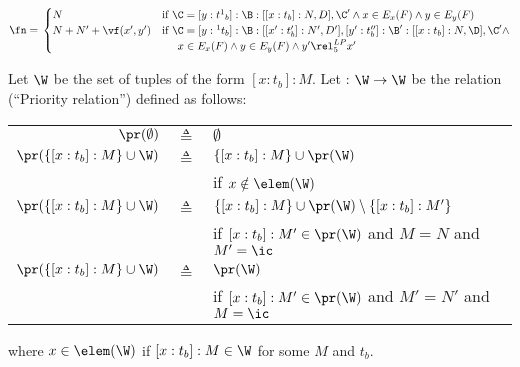 $\fn=\\
\begin{cases}

N & \mbox{if } \C=[y:{t^1}_b]:\B:[[x:t_b]:N,D],\C' \wedge x\in E_x(F) \wedge y\in E_y(F)  \\

N+N'+\vf(x',y') & \mbox{if } \C=[y:{^1}t_b]:\B:[[x':t_b']:N',D'],[y':t_b'']:\B':[[x:t_b]:N,\D],\C' \wedge \\
&  \mbox{\hspace{0.5cm}} x\in E_x(F) \wedge y\in E_y(F) \wedge y'\rel^{LP}_5 x'




\end{cases}$









\begin{definition}




Let $\W$ be the set of tuples of the form $[x:t_b]:M$. Let \pr: $\W \rightarrow \W$ be the relation (``Priority relation'') defined as follows: \\

\begin{center}

\begin{tabular}{r l l}

$\pr(\emptyset)$  & $\triangleq$  & $\emptyset$\\

$\pr(\{[x:t_b]:M\} \cup \W)$ &  $\triangleq$ & $\{[x:t_b]:M\} \cup \pr(\W)$ \\

& \hfill  & if $x \notin \elem(\W)$\\

$\pr(\{[x:t_b]:M\} \cup \W)$ &  $\triangleq$ & $\{[x:t_b]:M\} \cup \pr(\W) \setminus \{[x:t_b]:M'\}$ \\ 
& \hfill & if $[x:t_b]:M' \in \pr(\W)$ and $M=N$ and $M'=\ic$ \\
 
 $\pr(\{[x:t_b]:M\} \cup \W)$ & $\triangleq$ &  $\pr(\W)$\\ 
 
 & \hfill & if $[x:t_b]:M' \in \pr(\W)$ and $M'=N'$ and $M=\ic$\\
        
\end{tabular}

\end{center}
\vspace{2mm}
where $x\in \elem(\W)$ if $[x:t_b]:M \in \W$ for some $M$ and $t_b$.
\end{definition}
\vspace{0.5cm}



